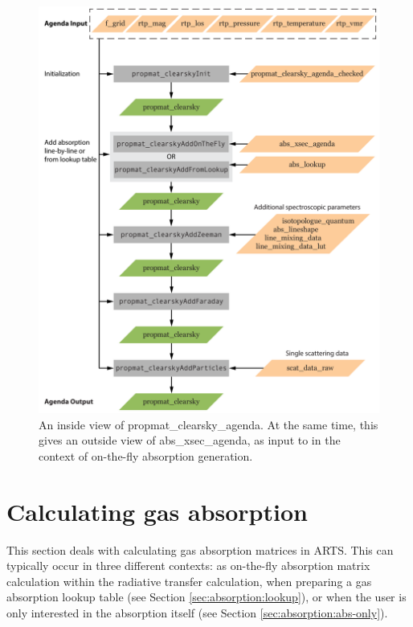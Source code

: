 \begin{figure}
 \begin{center}
  \includegraphics[scale=0.7]{propmat_clearsky_agenda_detail}
  \caption{An inside view of propmat\_clearsky\_agenda. At the same
    time, this gives an outside view of abs\_xsec\_agenda, as input to
     in the context of
    on-the-fly absorption generation.
    }
  \label{fig:absorption:pmat_inside}
 \end{center}
\end{figure}



\section{Calculating gas absorption}
\label{sec:absorption:calculating}

This section deals with calculating gas absorption matrices in
ARTS.  This can typically occur in three different contexts:
as on-the-fly absorption matrix calculation within the radiative transfer
calculation,
when preparing
a gas absorption lookup table (see Section \ref{sec:absorption:lookup}),
or when the user is only interested in the absorption itself (see Section
\ref{sec:absorption:abs-only}).

